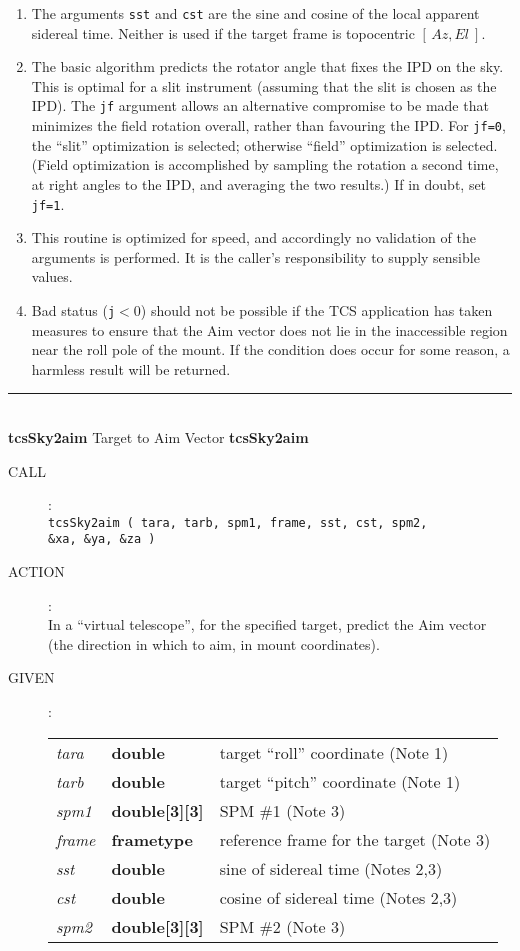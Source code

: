 \documentclass[12pt,fleqn,twoside]{article}
\renewcommand{\_}{{\tt\char'137}}     %
\newcommand{\azel}      {$[\,Az,El~]$}
\newcommand{\routine}[2]
{
  \newpage
  \rule{\textwidth}{0.3mm}\\ \nopagebreak
  {\Large {\bf #1} \hfill #2 \hfill {\bf #1}}
  \vspace{-1ex}
}
\newcommand{\call}[1]
{
  \goodbreak
  \begin{description}
    \item[CALL]: \\[0.5ex] \nopagebreak
        {\tt #1}
  \end{description}
  \vspace{-3ex}
}
\newcommand{\action}[1]
{
  \goodbreak
  \begin{description}
    \item[ACTION]: \\[0.5ex] \nopagebreak
        #1
  \end{description}
  \vspace{-3ex}
}
\newcommand{\args}[2]
{
  \goodbreak
  \begin{description}
  \item[#1]: \\[1.5ex] \nopagebreak
    \hspace*{-0.9em}
    \begin{tabular}{p{4.5em}p{5.8em}p{23.5em}}
      #2
    \end{tabular}
  \end{description}
  \vspace{-3ex}
}
\newcommand{\spec}[3]
{
  {\em {#1}} & {\bf \mbox{#2}} & {#3}
}
\begin{document}
{\begin{enumerate}
      Repeated calls to this routine, using the new demand as the
      estimated demand for the next iteration, will lead to
      convergence.  Explicit iteration is unlikely to be needed
      operationally if the rotator calculation is being performed
      as part of the regular tracking updates, say at 20~Hz.
\item The arguments {\tt sst} and {\tt cst}
      are the sine and cosine of the local
      apparent sidereal time.  Neither is used if the target frame is
      topocentric \azel.
\item The basic algorithm predicts the rotator angle that fixes the IPD
      on the sky.  This is optimal for a slit instrument (assuming that
      the slit is chosen as the IPD).  The {\tt jf} argument allows an
      alternative compromise to be made that minimizes the field
      rotation overall, rather than favouring the IPD.  For {\tt jf=0},
      the ``slit'' optimization is selected;  otherwise ``field''
      optimization is selected.  (Field optimization is accomplished by
      sampling the rotation a second time, at right angles to the IPD,
      and averaging the two results.)  If in doubt, set {\tt jf=1}.
\item This routine is optimized for speed, and accordingly no
      validation of the arguments is performed.  It is the caller's
      responsibility to supply sensible values.
\item Bad status ({\tt j}$<0$) should not
      be possible if the TCS application
      has taken measures to ensure that the {\sc Aim} vector does not lie in
      the inaccessible region near the roll pole of the mount.  If the
      condition does occur for some reason, a harmless result will be
      returned.
\end{enumerate}
}
\routine{tcsSky2aim}{Target to {\sc Aim} Vector}
\label{tcsSky2aim}
\call{tcsSky2aim ( tara, tarb, spm1, frame, sst, cst, spm2, \\
   \hspace*{6.1em} \&xa, \&ya, \&za ) }
\action{In a ``virtual telescope'', for the specified target, predict the
        {\sc Aim} vector (the direction in which to aim,
        in mount coordinates).}
\args{GIVEN}
{
\spec{tara}{double}{target ``roll'' coordinate (Note 1)} \\
\spec{tarb}{double}{target ``pitch'' coordinate (Note 1)} \\
\spec{spm1}{double[3][3]}{SPM \#1 (Note 3)} \\
\spec{frame}{{\sc frametype}}{reference frame for the target (Note 3)} \\
\spec{sst}{double}{sine of sidereal time (Notes 2,3)} \\
\spec{cst}{double}{cosine of sidereal time (Notes 2,3)} \\
\spec{spm2}{double[3][3]}{SPM \#2 (Note 3)}
}
\end{document}
